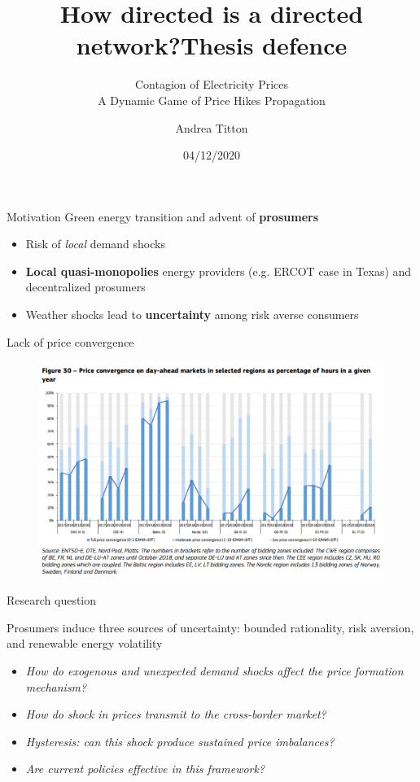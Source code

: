 \documentclass{beamer}
\title{How directed is a directed network?}
\author{Andrea Titton}
\title{Thesis defence}
\subtitle{Contagion of Electricity Prices \\ A Dynamic Game of Price Hikes Propagation}
\institute{Tinbergen Institute}
\date{04/12/2020}
\begin{document}
\frame{\titlepage}

\begin{frame}{Motivation}
    Green energy transition and advent of \textbf{prosumers}
    \vspace{2em}
    \begin{itemize} \setlength\itemsep{1.5em}
              \pause \item Risk of \textit{local} demand shocks
              \pause \item \textbf{Local quasi-monopolies} energy providers (e.g. ERCOT case in Texas) and decentralized prosumers
              \pause \item Weather shocks lead to \textbf{uncertainty} among risk averse consumers
    \end{itemize}
\end{frame}

\begin{frame}{Lack of price convergence}
    \begin{figure}
        \includegraphics[height = 0.7\textheight]{figures/convergence.PNG}
        \caption{\cite{Report2019}}
    \end{figure}
\end{frame}

\begin{frame}{Research question}

    Prosumers induce three sources of uncertainty: bounded rationality, risk aversion, and renewable energy volatility

    \begin{itemize} \setlength{\itemsep}{1em}
        \item \textit{How do exogenous and unexpected demand shocks affect the price formation mechanism?} \pause
        \item \textit{How do shock in prices transmit to the cross-border market?} \pause
        \item \textit{Hysteresis: can this shock produce sustained price imbalances?} \pause
        \item \textit{Are current policies effective in this framework?}
    \end{itemize}

\end{frame}
\end{document}
